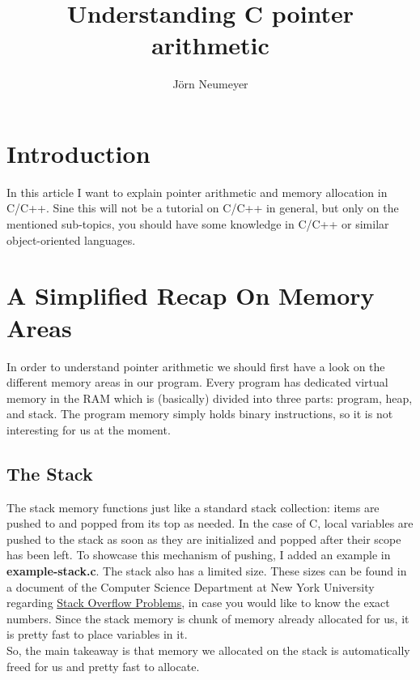 \documentclass{article}
\author{J\"orn Neumeyer}
\title{Understanding C pointer arithmetic}
\begin{document}
  \maketitle
  \tableofcontents
  \section{Introduction}
  In this article I want to explain pointer arithmetic and memory allocation in C/C++.
  Sine this will not be a tutorial on C/C++ in general, but only on the mentioned sub-topics, you should have some knowledge in C/C++ or similar object-oriented languages.
  \section{A Simplified Recap On Memory Areas}
  In order to understand pointer arithmetic we should first have a look on the different memory areas in our program.
  Every program has dedicated virtual memory in the RAM which is (basically) divided into three parts: program, heap, and stack.
  The program memory simply holds binary instructions, so it is not interesting for us at the moment.
  \subsection{The Stack}
  The stack memory functions just like a standard stack collection: items are pushed to and popped from its top as needed.
  In the case of C, local variables are pushed to the stack as soon as they are initialized and popped after their scope has been left.
  To showcase this mechanism of pushing, I added an example in \textbf{example-stack.c}.
  The stack also has a limited size.
  These sizes can be found in a document of the Computer Science Department at New York University regarding \href{https://cs.nyu.edu/exact/core/doc/stackOverflow.txt}{Stack Overflow Problems}, in case you would like to know the exact numbers.
  Since the stack memory is chunk of memory already allocated for us, it is pretty fast to place variables in it.
  \\So, the main takeaway is that memory we allocated on the stack is automatically freed for us and pretty fast to allocate.
\end{document}
